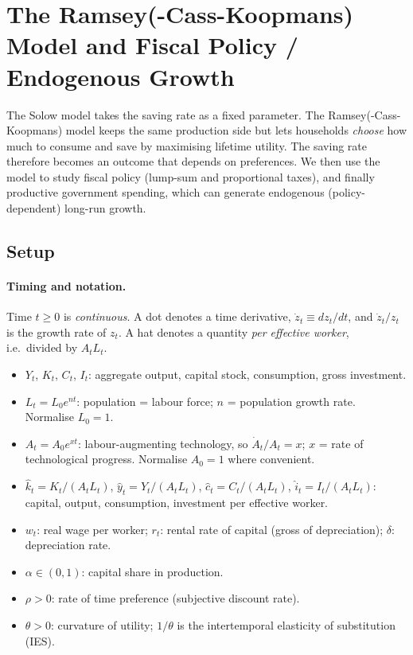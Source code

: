 \section{The Ramsey(-Cass-Koopmans) Model and Fiscal Policy / Endogenous Growth}

The Solow model takes the saving rate as a fixed parameter. The Ramsey(-Cass-Koopmans) model keeps the same production side but lets households \emph{choose} how much to consume and save by maximising lifetime utility. The saving rate therefore becomes an outcome that depends on preferences. We then use the model to study fiscal policy (lump-sum and proportional taxes), and finally productive government spending, which can generate endogenous (policy-dependent) long-run growth.

\subsection{Setup }

\paragraph{Timing and notation.} Time $t\ge0$ is \emph{continuous}. A dot denotes a time derivative, $\dot z_t\equiv dz_t/dt$, and $\dot z_t/z_t$ is the growth rate of $z_t$. A hat denotes a quantity \emph{per effective worker}, i.e.\ divided by $A_tL_t$.

\begin{itemize}
\item $Y_t$, $K_t$, $C_t$, $I_t$: aggregate output, capital stock, consumption, gross investment.
\item $L_t=L_0e^{nt}$: population = labour force; $n$ = population growth rate. Normalise $L_0=1$.
\item $A_t=A_0e^{xt}$: labour-augmenting technology, so $\dot A_t/A_t=x$; $x$ = rate of technological progress. Normalise $A_0=1$ where convenient.
\item $\hat k_t=K_t/(A_tL_t)$, $\hat y_t=Y_t/(A_tL_t)$, $\hat c_t=C_t/(A_tL_t)$, $\hat i_t=I_t/(A_tL_t)$: capital, output, consumption, investment per effective worker.
\item $w_t$: real wage per worker; $r_t$: rental rate of capital (gross of depreciation); $\delta$: depreciation rate.
\item $\alpha\in(0,1)$: capital share in production.
\item $\rho>0$: rate of time preference (subjective discount rate).
\item $\theta>0$: curvature of utility; $1/\theta$ is the intertemporal elasticity of substitution (IES).
\end{itemize}

